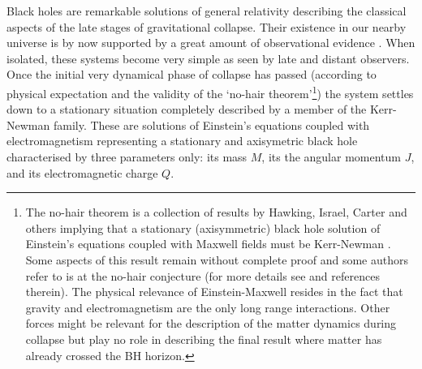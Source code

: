 \documentclass[aps, nofootinbib,superscriptaddress,12pt]{revtex4-2}
\begin{document}
Black holes are remarkable solutions of general relativity describing the classical  aspects of the late stages
of gravitational collapse. Their existence in our nearby
universe is by now supported by a great amount of observational evidence \cite{Narayan:2013gca}. When isolated, these systems
become very simple as seen by late and distant observers. Once the initial very dynamical phase of collapse has passed (according to physical expectation and the validity of the `no-hair theorem'\footnote{The no-hair theorem is   a collection of results by Hawking, Israel, Carter and others implying that a stationary (axisymmetric) black hole solution of Einstein's equations coupled with Maxwell fields must be Kerr-Newman \cite{Israel:1967wq, Israel:1967za, Carter:1971zc}. Some aspects of this result remain without complete proof and some authors refer to is at the no-hair conjecture (for more details see \cite{Dafermos:2008en} and references therein). The physical relevance of Einstein-Maxwell resides in the fact that gravity and electromagnetism are the only long range interactions. Other forces might be relevant for the description of the matter dynamics during collapse but play no role in describing the final result where matter has already crossed the BH horizon. }) the system settles
down to a stationary situation completely described by a member of the Kerr-Newman family. These are solutions of Einstein's equations coupled with electromagnetism representing a stationary and axisymetric black hole characterised by three parameters only:  its mass $M$, its the angular momentum $J$, and its electromagnetic charge $Q$.
\end{document}
